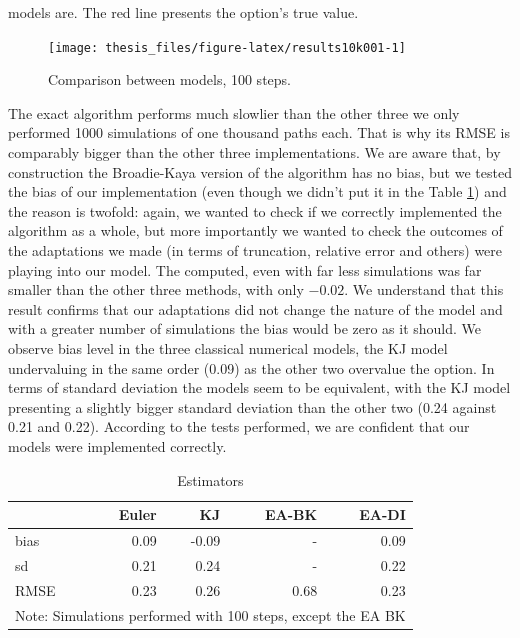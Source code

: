 \documentclass[12pt,twoside]{reedthesis}
\theoremstyle{definition}
\theoremstyle{definition}
\theoremstyle{remark}
\begin{document}
  models are. The red line presents the option's true value.
  \begin{figure}
  
  {\centering \texttt{[image: thesis\_files/figure-latex/results10k001-1]} 
  
  }
  
  \caption{Comparison between models, 100 steps. \label{results10k001}}\label{fig:results10k001}
  \end{figure}
  The exact algorithm performs much slowlier than the other three we only
  performed 1000 simulations of one thousand paths each. That is why its
  RMSE is comparably bigger than the other three implementations. We are
  aware that, by construction the Broadie-Kaya version of the algorithm
  has no bias, but we tested the bias of our implementation (even though
  we didn't put it in the Table \ref{res2}) and the reason is twofold:
  again, we wanted to check if we correctly implemented the algorithm as a
  whole, but more importantly we wanted to check the outcomes of the
  adaptations we made (in terms of truncation, relative error and others)
  were playing into our model. The computed, even with far less
  simulations was far smaller than the other three methods, with only
  \(-0.02\). We understand that this result confirms that our adaptations
  did not change the nature of the model and with a greater number of
  simulations the bias would be zero as it should. We observe bias level
  in the three classical numerical models, the KJ model undervaluing in
  the same order (0.09) as the other two overvalue the option. In terms of
  standard deviation the models seem to be equivalent, with the KJ model
  presenting a slightly bigger standard deviation than the other two (0.24
  against 0.21 and 0.22). According to the tests performed, we are
  confident that our models were implemented correctly.
  \begin{table}[t]
  \centering
  \begin{tabular}{lrrrr}
    \hline 
   & Euler & KJ & EA-BK & EA-DI \\ 
    \hline 
  bias & 0.09 & -0.09 & - & 0.09 \\ 
    sd & 0.21 & 0.24 & - & 0.22 \\ 
    RMSE & 0.23 & 0.26 & 0.68 & 0.23 \\ 
     \hline 
  \multicolumn{5}{l}{\scriptsize{Note: Simulations performed with 100 steps, except the EA BK}} 
  \end{tabular}
  \caption{Estimators} 
  \label{res2}
  \end{table}
\end{document}
